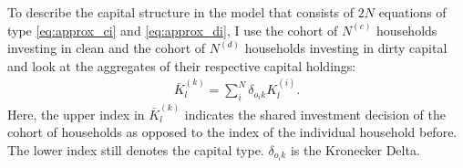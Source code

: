 To describe the capital structure in the model that consists of $2N$ equations of type \eqref{eq:approx_ci} and \eqref{eq:approx_di}, I use the cohort of $N^{(c)}$ households investing in clean and the cohort of $N^{(d)}$ households investing in dirty capital and look at the aggregates of their respective capital holdings:
\begin{align}
  \bar{K}_l^{(k)} = \sum_{i}^{N} \delta_{o_ik} K_l^{(i)}.%
	\label{eq:moments_definition}
\end{align}
Here, the upper index in $\bar{K}_l^{(k)}$ indicates the shared investment decision of the cohort of households as opposed to the index of the individual household before. The lower index still denotes the capital type. $\delta_{o_ik}$ is the Kronecker Delta.

